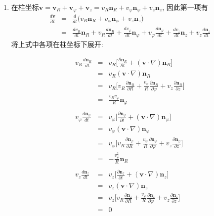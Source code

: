 \begin{solution}
\begin{enumerate}
\item 在柱坐标$\mathbf{v} =\mathbf{v}_R+\mathbf{v}_\varphi + \mathbf{v}_z =v_R\mathbf{n}_R + v_\varphi \mathbf{n}_\varphi+v_z\mathbf{n}_z$, 因此第一项有
{\setlength\arraycolsep{1pt}
\begin{eqnarray}
\frac{d\mathbf{v}}{dt} & = & \frac{d}{dt}\Big(v_R\mathbf{n}_R+v_\varphi \mathbf{n}_\varphi+v_z\mathbf{n}_z\Big)
\nonumber\\
& = & \frac{dv_R}{dt}\mathbf{n}_R + v_R\frac{d\mathbf{n}_R}{dt}
+ \frac{dv_\varphi}{dt}\mathbf{n}_\varphi + v_\varphi\frac{d\mathbf{n}_\varphi}{dt}
+ \frac{dv_z}{dt}\mathbf{n}_z + v_z\frac{d\mathbf{n}_z}{dt}
\nonumber
\end{eqnarray}}
将上式中各项在柱坐标下展开:
\begin{multicols}{2}
\setlength{\abovedisplayskip}{-5pt}
\begin{eqnarray}
v_R\frac{d\mathbf{n}_R}{dt} & = & v_R\Big[\frac{\partial\mathbf{n}_R}{\partial t} + (\mathbf{v}\cdot \nabla)\mathbf{n}_R\Big]\nonumber\\
 & = &  v_R(\mathbf{v}\cdot \nabla)\mathbf{n}_R
\nonumber\\
& = & v_R\Big[
v_R\frac{\partial \mathbf{n}_R}{\partial R} + \frac{v_\varphi}{R}\frac{\partial\mathbf{n}_R}{\partial\varphi}
+ v_z\frac{\partial\mathbf{n}_R}{\partial z}
\Big]\nonumber\\
& = &  \frac{v_Rv_\varphi}{R}\mathbf{n}_\varphi
\nonumber\\
\nonumber\\
v_\varphi\frac{d\mathbf{n}_\varphi}{dt}
& = & v_\varphi\Big[\frac{\partial\mathbf{n}_\varphi}{\partial t} + (\mathbf{v}\cdot \nabla)\mathbf{n}_\varphi\Big]\nonumber\\
 & = &  v_\varphi(\mathbf{v}\cdot \nabla)\mathbf{n}_\varphi
\nonumber\\
& = &
v_\varphi\Big[
v_R\frac{\partial \mathbf{n}_\varphi}{\partial R} + \frac{v_\varphi}{R}\frac{\partial\mathbf{n}_\varphi}{\partial\varphi}
+ v_z\frac{\partial\mathbf{n}_\varphi}{\partial z}
\Big]
\nonumber\\
& = & -\frac{v_\varphi ^2}{R}\mathbf{n}_R
\nonumber\\
\nonumber\\
%
v_z\frac{d\mathbf{n}_z}{dt} & = &
v_z\Big[\frac{\partial\mathbf{n}_z}{\partial t} + (\mathbf{v}\cdot \nabla)\mathbf{n}_z\Big]\nonumber\\
 & = &  v_z(\mathbf{v}\cdot \nabla)\mathbf{n}_z
\nonumber\\
& = &
v_z\Big[
v_R\frac{\partial \mathbf{n}_z}{\partial R} + \frac{v_\varphi}{R}\frac{\partial\mathbf{n}_z}{\partial \varphi}
+ v_z\frac{\partial\mathbf{n}_z}{\partial z}
\Big]
\nonumber\\
& = & 0
\nonumber
\end{eqnarray}


\end{multicols}
\end{enumerate}
\end{solution}
